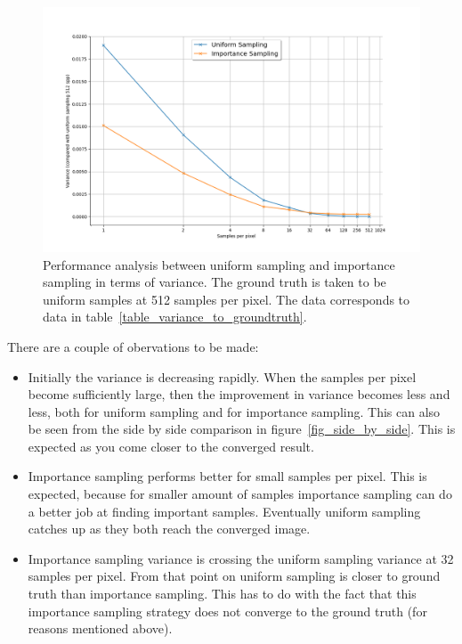 \documentclass[11pt,a4paper]{report}
\begin{document}
\begin{figure}[h]
\begin{center}
\includegraphics[scale=0.4]{variance-results/variance-plot.png}
\end{center}
\caption{Performance analysis between uniform sampling and importance sampling in terms of variance. The ground truth is taken to be uniform samples at 512 samples per pixel. The data corresponds to data in table~\ref{table_variance_to_groundtruth}.}
\label{fig_variance_plot}
\end{figure}


There are a couple of obervations to be made:
\begin{itemize}

\item Initially the variance is decreasing rapidly. When the samples per pixel become sufficiently large, then the improvement in variance becomes less and less, both for uniform sampling and for importance sampling. This can also be seen from the side by side comparison in figure~\ref{fig_side_by_side}. This is expected as you come closer to the converged result.

\item Importance sampling performs better for small samples per pixel. This is expected, because for smaller amount of samples importance sampling can do a better job at finding important samples. Eventually uniform sampling catches up as they both reach the converged image.

\item Importance sampling variance is crossing the uniform sampling variance at 32 samples per pixel. From that point on uniform sampling is closer to ground truth than importance sampling. This has to do with the fact that this importance sampling strategy does not converge to the ground truth (for reasons mentioned above).


\end{itemize}
\end{document}
